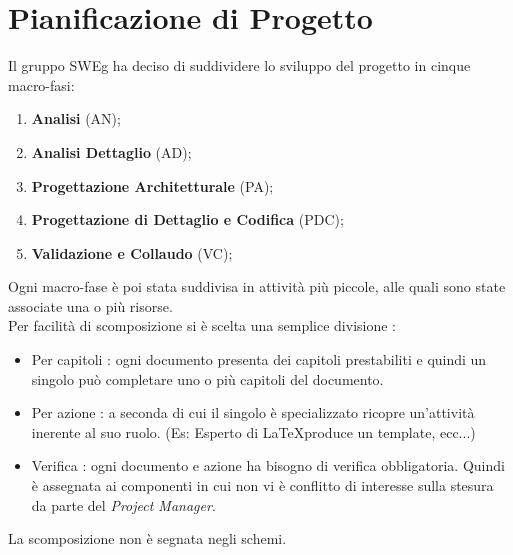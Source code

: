\documentclass[12pt,a4paper,titlepage]{article}
\begin{document}
	\section{Pianificazione di Progetto}
	Il gruppo SWEg ha deciso di suddividere lo sviluppo del progetto in cinque macro-fasi:
	\\
	\begin{enumerate}
		\item \textbf{Analisi} (AN);
		\item \textbf{Analisi Dettaglio} (AD);
		\item \textbf{Progettazione Architetturale} (PA);
		\item \textbf{Progettazione di Dettaglio e Codifica} (PDC);
		\item \textbf{Validazione e Collaudo} (VC);
	\end{enumerate}
	Ogni macro-fase è poi stata suddivisa in attività più piccole, alle quali sono state associate una o più risorse. \\
	Per facilità di scomposizione si è scelta una semplice divisione :
	\begin{itemize}
		\item Per capitoli : ogni documento presenta dei capitoli prestabiliti e quindi un singolo può completare uno o più capitoli del documento.
		\item Per azione : a seconda di cui il singolo è specializzato ricopre un'attività inerente al suo ruolo. (Es: Esperto di \LaTeX produce un template, ecc...)
		\item Verifica : ogni documento e azione ha bisogno di verifica obbligatoria. Quindi è assegnata ai componenti in cui non vi è conflitto di interesse sulla stesura da parte del \textit{Project Manager}.
	\end{itemize} 
	La scomposizione non è segnata negli schemi. 
	
	
\end{document}
